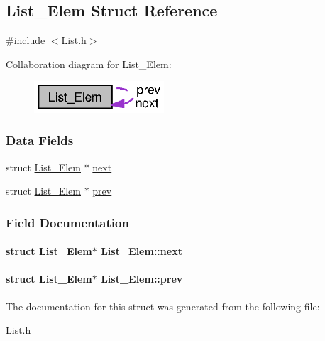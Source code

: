 \subsection{List\+\_\+\+Elem Struct Reference}
\label{struct_list___elem}


{\ttfamily \#include $<$List.\+h$>$}



Collaboration diagram for List\+\_\+\+Elem\+:
\nopagebreak
\begin{figure}[H]
\begin{center}
\leavevmode
\includegraphics[width=137pt]{struct_list___elem__coll__graph}
\end{center}
\end{figure}
\subsubsection*{Data Fields}
\begin{DoxyCompactItemize}
\item 
struct \hyperlink{struct_list___elem}{List\+\_\+\+Elem} $\ast$ \hyperlink{struct_list___elem_a0f1336247f6538e230d2c23b3ce4c92e}{next}
\item 
struct \hyperlink{struct_list___elem}{List\+\_\+\+Elem} $\ast$ \hyperlink{struct_list___elem_aaf7affa6c4bd1d22a7b4beaf716be863}{prev}
\end{DoxyCompactItemize}


\subsubsection{Field Documentation}
\paragraph[{next}]{\setlength{\rightskip}{0pt plus 5cm}struct {\bf List\+\_\+\+Elem}$\ast$ List\+\_\+\+Elem\+::next}\label{struct_list___elem_a0f1336247f6538e230d2c23b3ce4c92e}
\paragraph[{prev}]{\setlength{\rightskip}{0pt plus 5cm}struct {\bf List\+\_\+\+Elem}$\ast$ List\+\_\+\+Elem\+::prev}\label{struct_list___elem_aaf7affa6c4bd1d22a7b4beaf716be863}


The documentation for this struct was generated from the following file\+:\begin{DoxyCompactItemize}
\item 
\hyperlink{_list_8h}{List.\+h}\end{DoxyCompactItemize}
